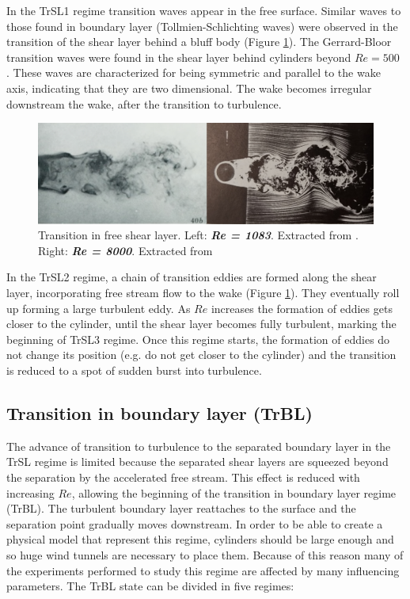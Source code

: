 \documentclass[journal]{new-aiaa}
\begin{document}
In the TrSL1 regime transition waves appear in the free surface. Similar waves to those found in boundary layer (Tollmien-Schlichting waves) were observed in the transition of the shear layer behind a bluff body (Figure \ref{fig:TrSL}). The Gerrard-Bloor transition waves were found in the shear layer behind cylinders beyond $Re=500$ \cite{Gerrard1978}. These waves are characterized for being symmetric and parallel to the wake axis, indicating that they are two dimensional. The wake becomes irregular downstream the wake, after the transition to turbulence.

\begin{figure}[H]
\begin{center}
\includegraphics[width=1\textwidth]{Images/federico/Figure05}
\caption{Transition in free shear layer. Left: \textbf{\textit{Re = 1083}}. Extracted from \cite{Gerrard1978}. Right: \textbf{\textit{Re = 8000}}. Extracted from \cite{Zdravkovich1997}}
\label{fig:TrSL}
\end{center}
\end{figure}

In the TrSL2 regime, a chain of transition eddies are formed along the shear layer, incorporating free stream flow to the wake (Figure \ref{fig:TrSL}). They eventually roll up forming a large turbulent eddy.  As $Re$ increases the formation of eddies  gets closer to the cylinder, until the shear layer becomes fully turbulent, marking the beginning of TrSL3 regime. Once this regime starts, the formation of eddies do not change its position (e.g. do not get closer to the cylinder) and the transition is reduced to a spot of sudden burst into turbulence.

\subsection{Transition in boundary layer (TrBL)}

The advance of transition to turbulence to the separated boundary layer in the TrSL regime is limited because  the separated shear layers are squeezed beyond the separation by the accelerated free stream. This effect is reduced with increasing $Re$, allowing the  beginning of the transition in boundary layer regime (TrBL). The turbulent boundary layer reattaches to the surface and the separation point gradually moves downstream. In order to be able to create a physical model that represent this regime, cylinders should be large enough and so huge wind tunnels are necessary to place them. Because of this reason many of the experiments performed to study this regime are affected by many influencing parameters. The TrBL state can be divided in five regimes:
\end{document}
